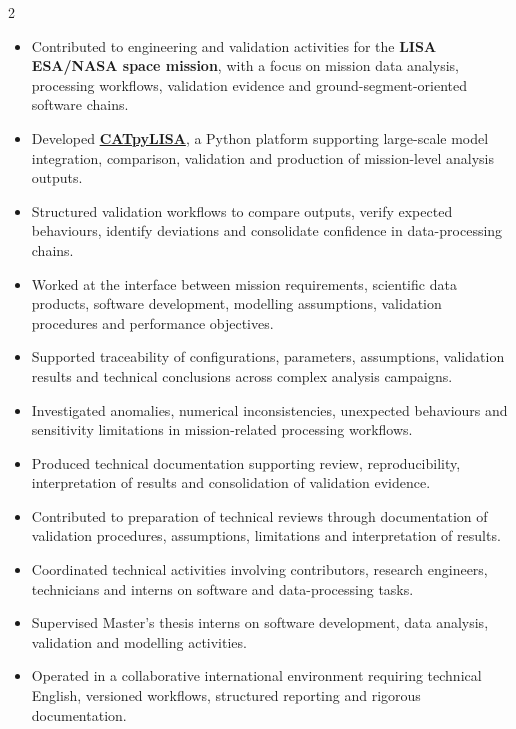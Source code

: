 \documentclass[8pt,a4paper,ragged2e,withhyper]{altacv}
\begin{document}
\begin{paracol}{2}
\begin{itemize}
\item Contributed to engineering and validation activities for the \textbf{LISA ESA/NASA space mission}, with a focus on mission data analysis, processing workflows, validation evidence and ground-segment-oriented software chains.
\item Developed \textcolor{DarkPastelRed}{\href{https://gitlab.oca.eu/gboileau/lisa_l3_tools}{\bf CATpyLISA}}, a Python platform supporting large-scale model integration, comparison, validation and production of mission-level analysis outputs.
\item Structured validation workflows to compare outputs, verify expected behaviours, identify deviations and consolidate confidence in data-processing chains.
\item Worked at the interface between mission requirements, scientific data products, software development, modelling assumptions, validation procedures and performance objectives.
\item Supported traceability of configurations, parameters, assumptions, validation results and technical conclusions across complex analysis campaigns.
\item Investigated anomalies, numerical inconsistencies, unexpected behaviours and sensitivity limitations in mission-related processing workflows.
\item Produced technical documentation supporting review, reproducibility, interpretation of results and consolidation of validation evidence.
\item Contributed to preparation of technical reviews through documentation of validation procedures, assumptions, limitations and interpretation of results.
\item Coordinated technical activities involving contributors, research engineers, technicians and interns on software and data-processing tasks.
\item Supervised Master's thesis interns on software development, data analysis, validation and modelling activities.
\item Operated in a collaborative international environment requiring technical English, versioned workflows, structured reporting and rigorous documentation.
\end{itemize}

\divider



\end{paracol}
\end{document}
